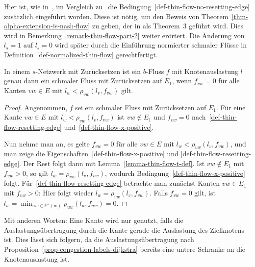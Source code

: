 \begin{remark}\label{remark-thin-flow}
	Hier ist, wie in~\cite[Definition~4]{Cominetti2011}, im Vergleich zu~\cite[Definition~6]{Koch2011} die Bedingung~\ref{def-thin-flow-no-resetting-edge} zusätzlich eingeführt worden.
	Diese ist nötig, um den Beweis von Theorem~\ref{thm-alpha-extension-is-nash-flow} zu geben, der in \cite{Koch2011} als Theorem~3 geführt wird.
	Dies wird in Bemerkung~\ref{remark-thin-flow-part-2} weiter erörtert.
	Die Änderung von $l_s=1$ auf $l_s=0$ wird später durch die Einführung normierter schmaler Flüsse in Definition~\ref{def-normalized-thin-flow} gerechtfertigt.
\end{remark}

\begin{lemma}\label{lemma-equivalent-thin-flow}
	In einem $s$-Netzwerk mit Zurücksetzen ist ein $b$-Fluss $f$ mit Knotenauslastung $l$ genau dann ein schmaler Fluss mit Zurück\-setzen auf $E_1$, wenn $f_{vw}= 0$ für alle Kanten $vw\in E$ mit $l_w < \rho_{vw}(l_v, f_{vw})$ gilt.
\end{lemma}
\begin{proof}
	Angenommen, $f$ sei ein schmaler Fluss mit Zurücksetzen auf $E_1$.
	Für eine Kante $vw\in E$ mit $l_w < \rho_{vw}(l_v, f_{vw})$ ist $vw\notin E_1$ und $f_{vw}=0$ nach~\ref{def-thin-flow-resetting-edge} und~\ref{def-thin-flow-x-positive}.

	Nun nehme man an, es gelte $f_{vw}=0$ für alle $vw\in E$ mit $l_w < \rho_{vw}(l_v, f_{vw})$, und man zeige die Eigenschaften~\ref{def-thin-flow-x-positive} und \ref{def-thin-flow-resetting-edge}.
	Der Rest folgt dann mit Lemma~\ref{lemma-thin-flow-t-def}.
	Ist $vw\notin E_1$ mit $f_{vw}>0$, so gilt $l_w = \rho_{vw}(l_v, f_{vw})$, wodurch Bedingung~\ref{def-thin-flow-x-positive} folgt.
	Für~\ref{def-thin-flow-resetting-edge} betrachte man zunächst Kanten $vw\in E_1$ mit $f_{vw}>0$:
	Hier folgt wieder $l_w = \rho_{vw}(l_v, f_{vw})$.
	Falls $f_{vw}=0$ gilt, ist $l_w=\min_{uw\in \delta^-(w)} \rho_{uw}(l_u, f_{uw}) = 0$.
\end{proof}

Mit anderen Worten: Eine Kante wird nur genutzt, falls die Auslastungs\-über\-tra\-gung durch die Kante gerade die Auslastung des Zielknotens ist.
Dies lässt sich folgern, da die Auslastungsübertragung nach Proposition~\ref{prop-congestion-labels-dijkstra} bereits eine untere Schranke an die Knotenauslastung ist.

